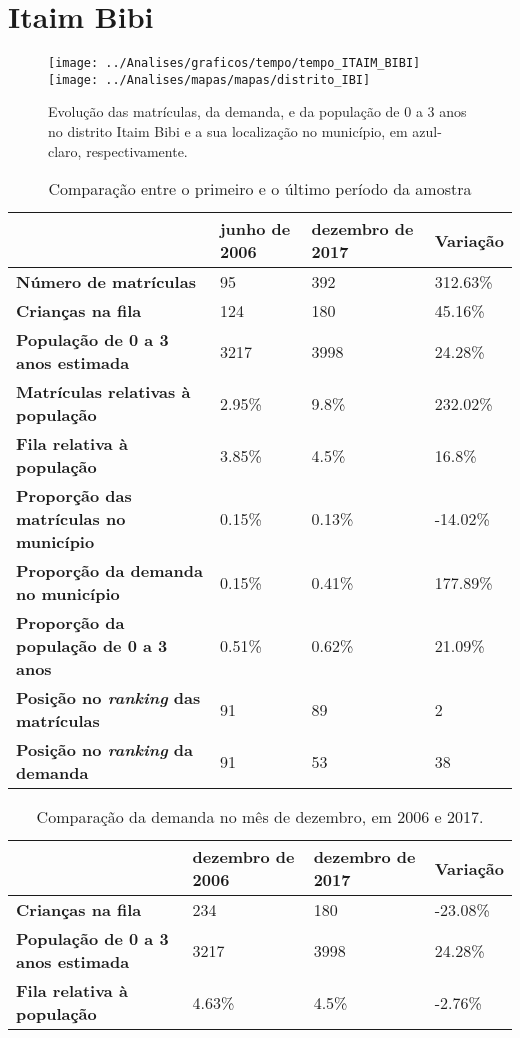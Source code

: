 \section{Itaim Bibi}
\begin{figure}[H]
\centering
\texttt{[image: ../Analises/graficos/tempo/tempo\_ITAIM\_BIBI]}
\texttt{[image: ../Analises/mapas/mapas/distrito\_IBI]}
\caption{Evolução das matrículas, da demanda, e da população de 0 a 3 anos no distrito Itaim Bibi e a sua localização no município, em azul-claro, respectivamente.}
\end{figure}
\begin{table}[H]
\begin{tabular}{l|l|l|l}
\textbf{}                                      & \textbf{junho de 2006}       & \textbf{dezembro de 2017}    & \textbf{Variação} \\ \hline
\textbf{Número de matrículas}                  & 95 & 392 & 312.63\% \\ \hline
\textbf{Crianças na fila}                      & 124 & 180 & 45.16\% \\ \hline
\textbf{População de 0 a 3 anos estimada}      & 3217 & 3998 & 24.28\% \\ \hline
\textbf{Matrículas relativas à população}      & 2.95\% & 9.8\% & 232.02\% \\ \hline
\textbf{Fila relativa à população}             & 3.85\% & 4.5\% & 16.8\% \\ \hline
\textbf{Proporção das matrículas no município} & 0.15\% & 0.13\% & -14.02\% \\ \hline
\textbf{Proporção da demanda no município}     & 0.15\% & 0.41\% & 177.89\% \\ \hline
\textbf{Proporção da população de 0 a 3 anos}  & 0.51\% & 0.62\% & 21.09\% \\ \hline
\textbf{Posição no \textit{ranking} das matrículas}     & 91 & 89 & 2 \\ \hline
\textbf{Posição no \textit{ranking} da demanda}         & 91 & 53 & 38 \\ 
\end{tabular}
\caption{Comparação entre o primeiro e o último período da amostra}
\end{table}
\begin{table}[H]
\begin{tabular}{l|l|l|l}
\textbf{}                                 & \textbf{dezembro de 2006} & \textbf{dezembro de 2017} & \textbf{Variação} \\ \hline
\textbf{Crianças na fila}                      & 234 & 180 & -23.08\% \\ \hline
\textbf{População de 0 a 3 anos estimada}      & 3217 & 3998 & 24.28\% \\ \hline
\textbf{Fila relativa à população}             & 4.63\% & 4.5\% & -2.76\% \\
\end{tabular}
\caption{Comparação da demanda no mês de dezembro, em 2006 e 2017.}
\end{table}
